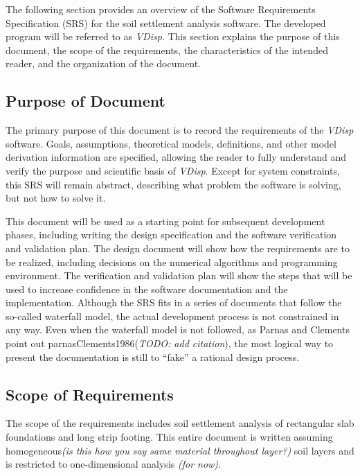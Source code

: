 \documentclass[12pt]{article}
\newcommand{\indentpar}{\phantom{=}}
\begin{document}
The following section provides an overview of the Software Requirements
Specification (SRS) for the soil settlement analysis software. The developed
program will be referred to as \emph{VDisp}. This section explains the purpose
of this document, the scope of the requirements, the characteristics of the
intended reader, and the organization of the document.


\subsection{Purpose of Document}

\indentpar \indentpar The primary purpose of this document is to record the requirements of 
the \emph{VDisp} software. Goals, assumptions, theoretical models, 
definitions, and other model derivation information are specified, allowing 
the reader to fully understand and verify the purpose and scientific basis 
of \emph{VDisp}. Except for system constraints, this SRS will 
remain abstract, describing what problem the software is solving, but not how to 
solve it.

This document will be used as a starting point for subsequent development
phases, including writing the design specification and the software verification
and validation plan. The design document will show how the requirements are to
be realized, including decisions on the numerical algorithms and programming
environment. The verification and validation plan will show the steps that will
be used to increase confidence in the software documentation and the
implementation. Although the SRS fits in a series of documents that follow the
so-called waterfall model, the actual development process is not constrained in
any way. Even when the waterfall model is not followed, as Parnas and Clements
point out parnasClements1986(\emph{TODO: add citation}), the most logical way to
present the documentation is still to ``fake'' a rational design process.

\subsection{Scope of Requirements} 

The scope of the requirements includes soil settlement analysis of rectangular
slab foundations and long strip footing. This entire document is written
assuming homogeneous\emph{(is this how you say same material throughout layer?)}
soil layers and is restricted to one-dimensional analysis \emph{(for now)}.
\end{document}
